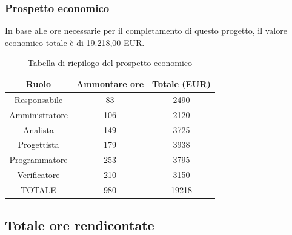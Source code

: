 \subsubsection{Prospetto economico}
In base alle ore necessarie per il completamento di questo progetto, il valore economico totale è di 19.218,00 EUR.
\begin{table}[h]
\caption{Tabella di riepilogo del prospetto economico}  
\begin{center}
\begin{tabular}{ |c|c|c|  }
 \hline
 Ruolo 		& Ammontare ore 	& Totale (EUR)\\
 \hline
 \hline
 	Responsabile	& 83 		& 2490\\
	Amministratore	& 106		& 2120\\
	Analista		& 149 		& 3725\\
	Progettista		& 179		& 3938\\
	Programmatore	& 253		& 3795\\
	Verificatore	& 210 		& 3150\\
 \hline\hline
 TOTALE		& 980		& 19218\\
  \hline
\end{tabular}
\end{center}
\end{table}

\newpage
\subsection{Totale ore rendicontate}
